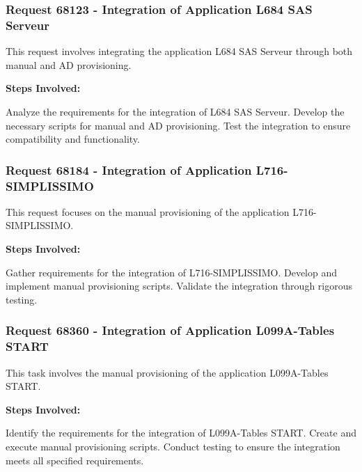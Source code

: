 \subsubsection{Request 68123 - Integration of Application L684 SAS Serveur}

This request involves integrating the application L684 SAS Serveur through both manual and AD provisioning.

\textbf{Steps Involved:}

     Analyze the requirements for the integration of L684 SAS Serveur.
     Develop the necessary scripts for manual and AD provisioning.
     Test the integration to ensure compatibility and functionality.


\subsubsection{Request 68184 - Integration of Application L716-SIMPLISSIMO}

This request focuses on the manual provisioning of the application L716-SIMPLISSIMO.

\textbf{Steps Involved:}

     Gather requirements for the integration of L716-SIMPLISSIMO.
     Develop and implement manual provisioning scripts.
     Validate the integration through rigorous testing.


\subsubsection{Request 68360 - Integration of Application L099A-Tables START}

This task involves the manual provisioning of the application L099A-Tables START.

\textbf{Steps Involved:}

     Identify the requirements for the integration of L099A-Tables START.
     Create and execute manual provisioning scripts.
     Conduct testing to ensure the integration meets all specified requirements.



